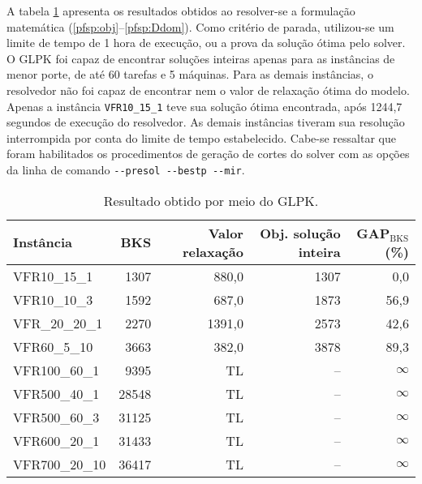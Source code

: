 \documentclass[12pt]{article}
\begin{document}
A tabela \ref{table:results-glpk} apresenta os resultados obtidos ao
resolver-se a formulação matemática (\ref{pfsp:obj}--\ref{pfsp:Ddom}). Como
critério de parada, utilizou-se um limite de tempo de 1 hora de execução, ou
a prova da solução ótima pelo solver. O GLPK foi capaz de encontrar
soluções inteiras apenas para as instâncias de menor porte, de até 60 tarefas e
5 máquinas. Para as demais instâncias, o resolvedor não foi capaz de encontrar
nem o valor de relaxação ótima do modelo. Apenas a instância
\texttt{VFR10\_15\_1} teve sua solução ótima encontrada, após 1244,7 segundos de
execução do resolvedor. As demais instâncias tiveram sua resolução interrompida
por conta do limite de tempo estabelecido. Cabe-se ressaltar que foram
habilitados os procedimentos de geração de cortes do solver com as opções da
linha de comando \texttt{-{}-presol -{}-bestp -{}-mir}.

\begin{table}[ht]
   \centering
   \footnotesize
   \begin{tabular}{lrrrr}
      \toprule
      Instância & BKS & Valor relaxação & Obj. solução inteira & GAP$_\mathrm{BKS}$ (\%) \\
      \midrule
      VFR10\_15\_1 & 1307 & 880,0 & 1307 & \phantom{0}0,0\\
      VFR10\_10\_3 & 1592 & 687,0 & 1873 & 56,9\\
      VFR\_20\_20\_1 & 2270 & 1391,0 & 2573 & 42,6\\
      VFR60\_5\_10 & 3663 & 382,0 & 3878 & 89,3\\
      VFR100\_60\_1 & 9395  &  TL & -- & $\infty$\\
      VFR500\_40\_1 & 28548 &  TL & -- & $\infty$\\
      VFR500\_60\_3 & 31125 &  TL & -- & $\infty$\\
      VFR600\_20\_1 & 31433 &  TL & -- & $\infty$\\
      VFR700\_20\_10 & 36417 & TL & -- & $\infty$\\ 
      \bottomrule
   \end{tabular}
   \caption{Resultado obtido por meio do GLPK.}
   \label{table:results-glpk}
\end{table}
\end{document}
